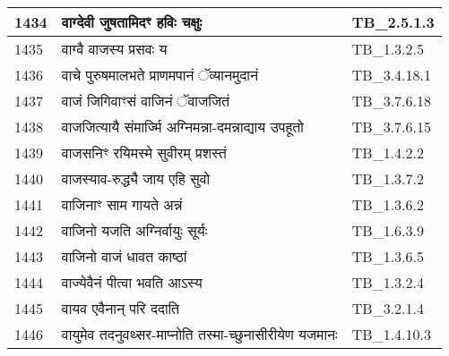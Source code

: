 \documentclass[17pt]{extarticle}
\begin{document}
\begin{longtable}{||p{0.4in}||p{4.9in}||p{0.9in}||}
    \hline
        
    1434 & वाग्देवी जुषतामिदꣳ हविः चक्षुः & TB\_2.5.1.3       \\
    
    \hline
        
    1435 & वाग्वै वाजस्य प्रसवः य & TB\_1.3.2.5       \\
    
    \hline
        
    1436 & वाचे पुरुषमालभते प्राणमपानं ॅव्यानमुदानं & TB\_3.4.18.1       \\
    
    \hline
        
    1437 & वाजं जिगिवाꣳसं वाजिनं ॅवाजजितं & TB\_3.7.6.18       \\
    
    \hline
        
    1438 & वाजजित्यायै संमार्ज्मि अग्निमन्ना{-}दमन्नाद्याय उपहूतो & TB\_3.7.6.15       \\
    
    \hline
        
    1439 & वाजसनिꣳ रयिमस्मे सुवीरम् प्रशस्तं & TB\_1.4.2.2       \\
    
    \hline
        
    1440 & वाजस्याव{-}रुद्ध्यै जाय एहि सुवो & TB\_1.3.7.2       \\
    
    \hline
        
    1441 & वाजिनाꣳ साम गायते अन्नं & TB\_1.3.6.2       \\
    
    \hline
        
    1442 & वाजिनो यजति अग्निर्वायुः सूर्यः & TB\_1.6.3.9       \\
    
    \hline
        
    1443 & वाजिनो वाजं धावत काष्ठां & TB\_1.3.6.5       \\
    
    \hline
        
    1444 & वाज्येवैनं पीत्वा भवति आऽस्य & TB\_1.3.2.4       \\
    
    \hline
        
    1445 & वायव एवैनान् परि ददाति & TB\_3.2.1.4       \\
    
    \hline
        
    1446 & वायुमेव तदनुवथ्सर{-}माप्नोति तस्मा{-}च्छुनासीरीयेण यजमानः & TB\_1.4.10.3       \\
    

\end{longtable}
\end{document}
